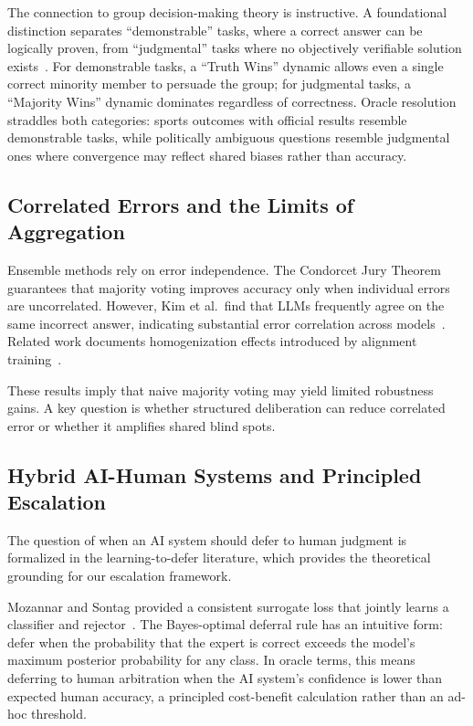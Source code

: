 The connection to group decision-making theory is instructive. A foundational distinction separates ``demonstrable'' tasks, where a correct answer can be logically proven, from ``judgmental'' tasks where no objectively verifiable solution exists~\cite{laughlin2011group}. For demonstrable tasks, a ``Truth Wins'' dynamic allows even a single correct minority member to persuade the group; for judgmental tasks, a ``Majority Wins'' dynamic dominates regardless of correctness. Oracle resolution straddles both categories: sports outcomes with official results resemble demonstrable tasks, while politically ambiguous questions resemble judgmental ones where convergence may reflect shared biases rather than accuracy.

\subsection{Correlated Errors and the Limits of Aggregation}

Ensemble methods rely on error independence. The Condorcet Jury Theorem guarantees that majority voting improves accuracy only when individual errors are uncorrelated. However, Kim et al.\ find that LLMs frequently agree on the same incorrect answer, indicating substantial error correlation across models~\cite{kim2025correlated}. Related work documents homogenization effects introduced by alignment training~\cite{wu2024monoculture, bai2025systematic}.

These results imply that naive majority voting may yield limited robustness gains. A key question is whether structured deliberation can reduce correlated error or whether it amplifies shared blind spots.

\subsection{Hybrid AI-Human Systems and Principled Escalation}

The question of when an AI system should defer to human judgment is formalized in the learning-to-defer literature, which provides the theoretical grounding for our escalation framework.

Mozannar and Sontag provided a consistent surrogate loss that jointly learns a classifier and rejector~\cite{mozannar2020consistent}. The Bayes-optimal deferral rule has an intuitive form: defer when the probability that the expert is correct exceeds the model's maximum posterior probability for any class. In oracle terms, this means deferring to human arbitration when the AI system's confidence is lower than expected human accuracy, a principled cost-benefit calculation rather than an ad-hoc threshold.

